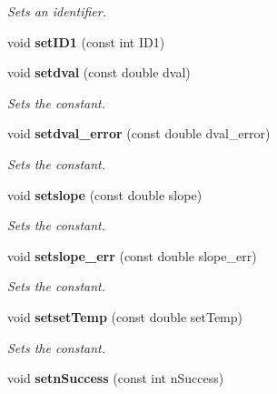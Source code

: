 \begin{DoxyCompactItemize}
\begin{DoxyCompactList}\small\item\em Sets an identifier. \item\end{DoxyCompactList}\item 
void {\bfseries setID1} (const int ID1)\label{classCALICE_1_1ScECALGainfit_a2b046a35db73f8edd6d633ba1d9327d8}

\item 
void {\bf setdval} (const double dval)\label{classCALICE_1_1ScECALGainfit_a7c858575bea67eae037fde913776f24f}

\begin{DoxyCompactList}\small\item\em Sets the constant. \item\end{DoxyCompactList}\item 
void {\bf setdval\_\-error} (const double dval\_\-error)\label{classCALICE_1_1ScECALGainfit_a4b533131ebc7ceb36ffff0587a352fa3}

\begin{DoxyCompactList}\small\item\em Sets the constant. \item\end{DoxyCompactList}\item 
void {\bf setslope} (const double slope)\label{classCALICE_1_1ScECALGainfit_a2e4662c5ac0958537d84277ec4415a35}

\begin{DoxyCompactList}\small\item\em Sets the constant. \item\end{DoxyCompactList}\item 
void {\bf setslope\_\-err} (const double slope\_\-err)\label{classCALICE_1_1ScECALGainfit_a736bb2b1b36100819166b95bca2a1d2b}

\begin{DoxyCompactList}\small\item\em Sets the constant. \item\end{DoxyCompactList}\item 
void {\bf setsetTemp} (const double setTemp)\label{classCALICE_1_1ScECALGainfit_a31a36742c735718fdc4a8d641e2d604e}

\begin{DoxyCompactList}\small\item\em Sets the constant. \item\end{DoxyCompactList}\item 
void {\bfseries setnSuccess} (const int nSuccess)\label{classCALICE_1_1ScECALGainfit_a1bb85cd01b6488edc32273c559fe785b}


\end{DoxyCompactItemize}

